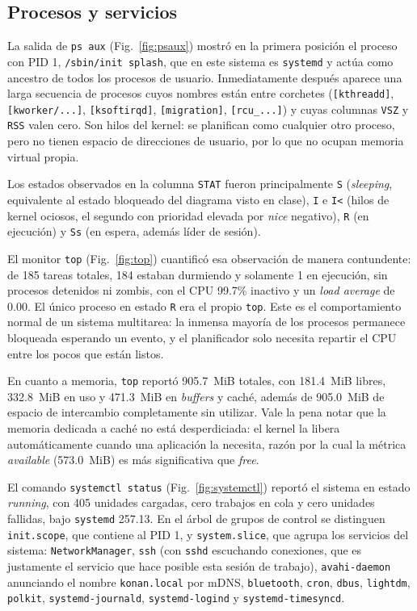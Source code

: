 \documentclass[conference]{IEEEtran}
\begin{document}
\subsection{Procesos y servicios}
La salida de \texttt{ps aux} (Fig.~\ref{fig:psaux}) mostró en la primera posición el proceso con PID 1, \texttt{/sbin/init splash}, que en este sistema es \texttt{systemd} y actúa como ancestro de todos los procesos de usuario. Inmediatamente después aparece una larga secuencia de procesos cuyos nombres están entre corchetes (\texttt{[kthreadd]}, \texttt{[kworker/...]}, \texttt{[ksoftirqd]}, \texttt{[migration]}, \texttt{[rcu\_...]}) y cuyas columnas \texttt{VSZ} y \texttt{RSS} valen cero. Son hilos del kernel: se planifican como cualquier otro proceso, pero no tienen espacio de direcciones de usuario, por lo que no ocupan memoria virtual propia.

Los estados observados en la columna \texttt{STAT} fueron principalmente \texttt{S} (\textit{sleeping}, equivalente al estado bloqueado del diagrama visto en clase), \texttt{I} e \texttt{I<} (hilos de kernel ociosos, el segundo con prioridad elevada por \textit{nice} negativo), \texttt{R} (en ejecución) y \texttt{Ss} (en espera, además líder de sesión).

El monitor \texttt{top} (Fig.~\ref{fig:top}) cuantificó esa observación de manera contundente: de 185 tareas totales, 184 estaban durmiendo y solamente 1 en ejecución, sin procesos detenidos ni zombis, con el CPU 99.7\% inactivo y un \textit{load average} de 0.00. El único proceso en estado \texttt{R} era el propio \texttt{top}. Este es el comportamiento normal de un sistema multitarea: la inmensa mayoría de los procesos permanece bloqueada esperando un evento, y el planificador solo necesita repartir el CPU entre los pocos que están listos.

En cuanto a memoria, \texttt{top} reportó 905.7~MiB totales, con 181.4~MiB libres, 332.8~MiB en uso y 471.3~MiB en \textit{buffers} y caché, además de 905.0~MiB de espacio de intercambio completamente sin utilizar. Vale la pena notar que la memoria dedicada a caché no está desperdiciada: el kernel la libera automáticamente cuando una aplicación la necesita, razón por la cual la métrica \textit{available} (573.0~MiB) es más significativa que \textit{free}.

El comando \texttt{systemctl status} (Fig.~\ref{fig:systemctl}) reportó el sistema en estado \textit{running}, con 405 unidades cargadas, cero trabajos en cola y cero unidades fallidas, bajo \texttt{systemd} 257.13. En el árbol de grupos de control se distinguen \texttt{init.scope}, que contiene al PID 1, y \texttt{system.slice}, que agrupa los servicios del sistema: \texttt{NetworkManager}, \texttt{ssh} (con \texttt{sshd} escuchando conexiones, que es justamente el servicio que hace posible esta sesión de trabajo), \texttt{avahi-daemon} anunciando el nombre \texttt{konan.local} por mDNS, \texttt{bluetooth}, \texttt{cron}, \texttt{dbus}, \texttt{lightdm}, \texttt{polkit}, \texttt{systemd-journald}, \texttt{systemd-logind} y \texttt{systemd-timesyncd}.
\end{document}
